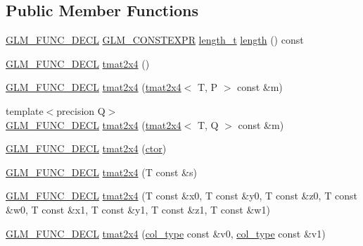 \subsection*{Public Member Functions}
\begin{DoxyCompactItemize}
\item 
\hyperlink{setup_8hpp_ab2d052de21a70539923e9bcbf6e83a51}{G\+L\+M\+\_\+\+F\+U\+N\+C\+\_\+\+D\+E\+CL} \hyperlink{setup_8hpp_a08b807947b47031d3a511f03f89645ad}{G\+L\+M\+\_\+\+C\+O\+N\+S\+T\+E\+X\+PR} \hyperlink{namespaceglm_a090a0de2260835bee80e71a702492ed9}{length\+\_\+t} \hyperlink{structglm_1_1detail_1_1tmat2x4_a8a0a8aaefd904ea85fe31f8bd9389693}{length} () const
\item 
\hyperlink{setup_8hpp_ab2d052de21a70539923e9bcbf6e83a51}{G\+L\+M\+\_\+\+F\+U\+N\+C\+\_\+\+D\+E\+CL} \hyperlink{structglm_1_1detail_1_1tmat2x4_aa0dd80e32a774e0f5e07a65c8a4d6c66}{tmat2x4} ()
\item 
\hyperlink{setup_8hpp_ab2d052de21a70539923e9bcbf6e83a51}{G\+L\+M\+\_\+\+F\+U\+N\+C\+\_\+\+D\+E\+CL} \hyperlink{structglm_1_1detail_1_1tmat2x4_a2246d953fc5f0c2024b887d1a4c83a06}{tmat2x4} (\hyperlink{structglm_1_1detail_1_1tmat2x4}{tmat2x4}$<$ T, P $>$ const \&m)
\item 
{\footnotesize template$<$precision Q$>$ }\\\hyperlink{setup_8hpp_ab2d052de21a70539923e9bcbf6e83a51}{G\+L\+M\+\_\+\+F\+U\+N\+C\+\_\+\+D\+E\+CL} \hyperlink{structglm_1_1detail_1_1tmat2x4_a6abbbe035dd18771e08fc4e8e25aa043}{tmat2x4} (\hyperlink{structglm_1_1detail_1_1tmat2x4}{tmat2x4}$<$ T, Q $>$ const \&m)
\item 
\hyperlink{setup_8hpp_ab2d052de21a70539923e9bcbf6e83a51}{G\+L\+M\+\_\+\+F\+U\+N\+C\+\_\+\+D\+E\+CL} \hyperlink{structglm_1_1detail_1_1tmat2x4_ad3a92b19fec6109e97262c6e43699ee9}{tmat2x4} (\hyperlink{structglm_1_1detail_1_1tmat2x4_a3876cfcf80892580917b2b0417c22c24}{ctor})
\item 
\hyperlink{setup_8hpp_ab2d052de21a70539923e9bcbf6e83a51}{G\+L\+M\+\_\+\+F\+U\+N\+C\+\_\+\+D\+E\+CL} \hyperlink{structglm_1_1detail_1_1tmat2x4_a3226371920e32b8cc562b6325f19d0f5}{tmat2x4} (T const \&s)
\item 
\hyperlink{setup_8hpp_ab2d052de21a70539923e9bcbf6e83a51}{G\+L\+M\+\_\+\+F\+U\+N\+C\+\_\+\+D\+E\+CL} \hyperlink{structglm_1_1detail_1_1tmat2x4_abc1d0f89ff3055acdb275ef0ef3904bd}{tmat2x4} (T const \&x0, T const \&y0, T const \&z0, T const \&w0, T const \&x1, T const \&y1, T const \&z1, T const \&w1)
\item 
\hyperlink{setup_8hpp_ab2d052de21a70539923e9bcbf6e83a51}{G\+L\+M\+\_\+\+F\+U\+N\+C\+\_\+\+D\+E\+CL} \hyperlink{structglm_1_1detail_1_1tmat2x4_ab0203c409f15c920754cb7ee35bb387c}{tmat2x4} (\hyperlink{structglm_1_1detail_1_1tmat2x4_a7324a2efc8a0f59f538568015bdda76b}{col\+\_\+type} const \&v0, \hyperlink{structglm_1_1detail_1_1tmat2x4_a7324a2efc8a0f59f538568015bdda76b}{col\+\_\+type} const \&v1)

\end{DoxyCompactItemize}
